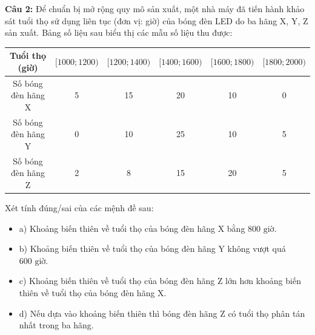 \documentclass[12pt]{article}
\begin{document}
	\noindent \textbf{Câu 2:} Để chuẩn bị mở rộng quy mô sản xuất, một nhà máy đã tiến hành khảo sát tuổi thọ sử dụng liên tục (đơn vị: giờ) của bóng đèn LED do ba hãng X, Y, Z sản xuất. Bảng số liệu sau biểu thị các mẫu số liệu thu được:
	\begin{center}
		\renewcommand{\arraystretch}{1.3}
		\begin{tabular}{|c|c|c|c|c|c|}
			\hline
			Tuổi thọ (giờ) & $[1000; 1200)$ & $[1200; 1400)$ & $[1400; 1600)$ & $[1600; 1800)$ & $[1800; 2000)$ \\
			\hline
			Số bóng đèn hãng X & 5 & 15 & 20 & 10 & 0 \\
			\hline
			Số bóng đèn hãng Y & 0 & 10 & 25 & 10 & 5 \\
			\hline
			Số bóng đèn hãng Z & 2 & 8 & 15 & 20 & 5 \\
			\hline
		\end{tabular}
	\end{center}
	Xét tính đúng/sai của các mệnh đề sau:
	\begin{itemize}[label=, leftmargin=*]
		\item  a) Khoảng biến thiên về tuổi thọ của bóng đèn hãng X bằng $800\text{ giờ}$.
		\item  b) Khoảng biến thiên về tuổi thọ của bóng đèn hãng Y không vượt quá $600\text{ giờ}$.
		\item  c) Khoảng biến thiên về tuổi thọ của bóng đèn hãng Z lớn hơn khoảng biến thiên về tuổi thọ của bóng đèn hãng X.
		\item  d) Nếu dựa vào khoảng biến thiên thì bóng đèn hãng Z có tuổi thọ phân tán nhất trong ba hãng.
	\end{itemize}
	
	\vspace{4mm}
	
\end{document}
